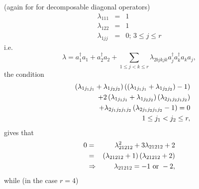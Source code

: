 \documentclass[12pt]{article}
\begin{document}
(again for for decomposable diagonal operators)%
\begin{eqnarray*}
\lambda _{111} &=&1 \\
\lambda _{122} &=&1 \\
\lambda _{1jj} &=&0;\,3\leq j\leq r
\end{eqnarray*}%
i.e. 
\begin{equation}
\lambda =a_{1}^{\dagger }a_{1}+a_{2}^{\dagger }a_{2}+\sum_{1\leq j<k\leq
r}\lambda _{2bjkjk}a_{j}^{\dagger }a_{k}^{\dagger }a_{k}a_{j},
\end{equation}%
the condition 
\begin{eqnarray}
&&\left( \lambda _{1j_{1}j_{1}}+\lambda _{1j_{2}j_{2}}\right) \left( \left(
\lambda _{1j_{1}j_{1}}+\lambda _{1j_{2}j_{2}}\right) -1\right)  \notag \\
&&+2\left( \lambda _{1j_{1}j_{1}}+\lambda _{1j_{2}j_{2}}\right) \left(
\lambda _{2j_{1}j_{2}j_{1}j_{2}}\right)  \notag \\
&&+\lambda _{2j_{1}j_{2}j_{1}j_{2}}\left( \lambda
_{2j_{1}j_{2}j_{1}j_{2}}-1\right) =0  \notag \\
&&1\leq j_{1}<j_{2}\leq r,
\end{eqnarray}%
gives that 
\begin{eqnarray}
0 &=&\lambda _{21212}^{2}+3\lambda _{21212}+2  \notag \\
&=&\left( \lambda _{21212}+1\right) \left( \lambda _{21212}+2\right)  \notag
\\
&\Rightarrow &\lambda _{21212}=-1\text{ or }-2,
\end{eqnarray}%
while (in the case $r=4$)
\end{document}
